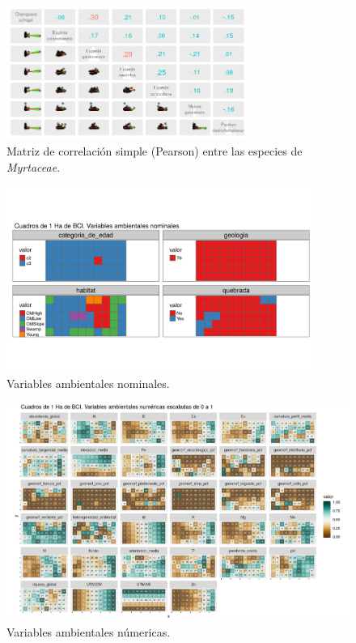 \documentclass[11pt,]{article}
\begin{document}
\begin{figure}
\centering
\includegraphics[width=0.70000\textwidth]{correlacion de pearson entre especies.png}
\caption{Matriz de correlación simple (Pearson) entre las especies de
\emph{Myrtaceae}.\label{fig:corresp}}
\end{figure}

\begin{figure}
\centering
\includegraphics[width=0.90000\textwidth]{mapas_variables_ambientales_nominales_tmap.png}
\caption{Variables ambientales nominales.\label{fig:ambvar}}
\end{figure}

\begin{figure}
\centering
\includegraphics[width=1.00000\textwidth]{mapas_variables_ambientales_numericas.png}
\caption{Variables ambientales númericas.\label{fig:varnum}}
\end{figure}
\end{document}
